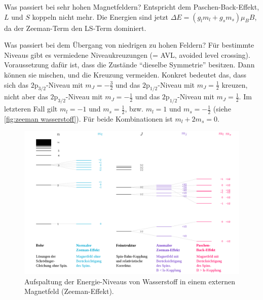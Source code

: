 \begin{fquestion}{Was passiert bei sehr hohen Magnetfeldern?}
    Entspricht dem Paschen-Back-Effekt, $L$ und $S$ koppeln nicht mehr.
    Die Energien sind jetzt $\Delta E = (g_lm_l + g_sm_s)\mu_B B$, da der Zeeman-Term den LS-Term dominiert.
\end{fquestion}

\begin{fquestion}{Was passiert bei dem Übergang von niedrigen zu hohen Feldern?}
    Für bestimmte Niveaus gibt es vermiedene Niveaukreuzungen (= AVL, avoided level crossing).
    Voraussetzung dafür ist, dass die Zustände ``dieselbe Symmetrie'' besitzen.
    Dann können sie mischen, und die Kreuzung vermeiden.
    Konkret bedeutet das, dass sich das $2\mathrm{p}_{3/2}$-Niveau mit $m_J = -\frac{3}{2}$ und das $2\mathrm{p}_{1/2}$-Niveau mit $m_J = \frac{1}{2}$ kreuzen, nicht aber das $2\mathrm{p}_{3/2}$-Niveau mit $m_J = -\frac{1}{2}$ und das $2\mathrm{p}_{1/2}$-Niveau mit $m_J = \frac{1}{2}$.
    Im letzteren Fall gilt $m_l = -1$ und $m_s = \frac{1}{2}$, bzw. $m_l = 1$ und $m_s = -\frac{1}{2}$ (siehe \autoref{fig:zeeman wasserstoff}).
    Für beide Kombinationen ist $m_l + 2m_s = 0$.
\end{fquestion}

\begin{figure}[!ht]
    \centering
    \includegraphics[width=\linewidth]{img/Wasserstoff_Zeeman.png}
    \caption{Aufspaltung der Energie-Niveaus von Wasserstoff in einem externen Magnetfeld (Zeeman-Effekt).
    }
    \label{fig:zeeman wasserstoff}
\end{figure}

